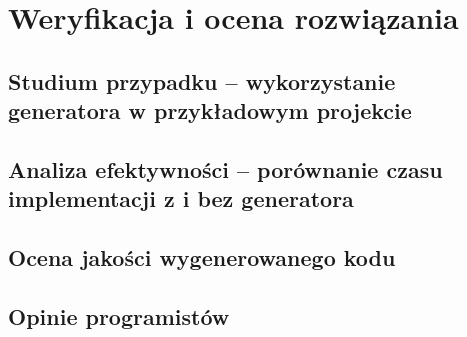 \newpage
\section{Weryfikacja i ocena rozwiązania}

\subsection{Studium przypadku – wykorzystanie generatora w przykładowym projekcie}

\subsection{Analiza efektywności – porównanie czasu implementacji z i bez generatora}

\subsection{Ocena jakości wygenerowanego kodu}

\subsection{Opinie programistów}